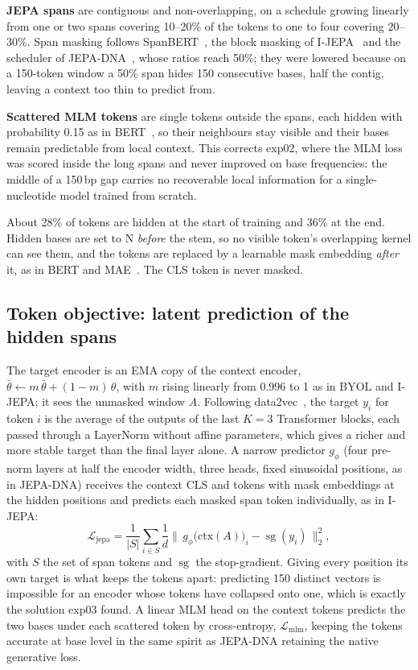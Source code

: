\documentclass[10pt,twocolumn,a4paper]{article}
\begin{document}
\textbf{JEPA spans} are contiguous and non-overlapping, on a schedule growing
linearly from one or two spans covering 10--20\% of the tokens to one to four
covering 20--30\%. Span masking follows SpanBERT~\cite{joshi2020spanbert}, the
block masking of I-JEPA~\cite{assran2023ijepa} and the scheduler of
JEPA-DNA~\cite{larey2026jepadna}, whose ratios reach 50\%; they were lowered
because on a 150-token window a 50\% span hides 150 consecutive bases, half the
contig, leaving a context too thin to predict from.

\textbf{Scattered MLM tokens} are single tokens outside the spans, each hidden
with probability 0.15 as in BERT~\cite{devlin2019bert}, so their neighbours stay
visible and their bases remain predictable from local context. This corrects
exp02, where the MLM loss was scored inside the long spans and never improved on
base frequencies: the middle of a 150\,bp gap carries no recoverable local
information for a single-nucleotide model trained from scratch.

About 28\% of tokens are hidden at the start of training and 36\% at the end.
Hidden bases are set to N \emph{before} the stem, so no visible token's
overlapping kernel can see them, and the tokens are replaced by a learnable mask
embedding \emph{after} it, as in BERT and MAE~\cite{he2022mae}. The CLS token is
never masked.

\subsection{Token objective: latent prediction of the hidden spans}\label{sec:tokobj}

The target encoder is an EMA copy of the context encoder,
$\bar\theta\leftarrow m\,\bar\theta+(1-m)\,\theta$, with $m$ rising linearly from
0.996 to 1 as in BYOL and I-JEPA; it sees the unmasked window $A$. Following
data2vec~\cite{baevski2022data2vec}, the target $y_i$ for token $i$ is the
average of the outputs of the last $K=3$ Transformer blocks, each passed through
a LayerNorm without affine parameters, which gives a richer and more stable
target than the final layer alone. A narrow predictor $g_\phi$ (four pre-norm
layers at half the encoder width, three heads, fixed sinusoidal positions, as in
JEPA-DNA) receives the context CLS and tokens with mask embeddings at the hidden
positions and predicts each masked span token individually, as in I-JEPA:
\begin{equation}
\mathcal{L}_{\text{jepa}}
 =\frac{1}{|S|}\sum_{i\in S}\frac{1}{d}
   \bigl\lVert\, g_\phi\bigl(\mathrm{ctx}(A)\bigr)_i-\operatorname{sg}(y_i)\,\bigr\rVert_2^2 ,
\end{equation}
with $S$ the set of span tokens and $\operatorname{sg}$ the stop-gradient. Giving
every position its own target is what keeps the tokens apart: predicting 150
distinct vectors is impossible for an encoder whose tokens have collapsed onto
one, which is exactly the solution exp03 found. A linear MLM head on the context
tokens predicts the two bases under each scattered token by cross-entropy,
$\mathcal{L}_{\text{mlm}}$, keeping the tokens accurate at base level in the same
spirit as JEPA-DNA retaining the native generative loss.
\end{document}
